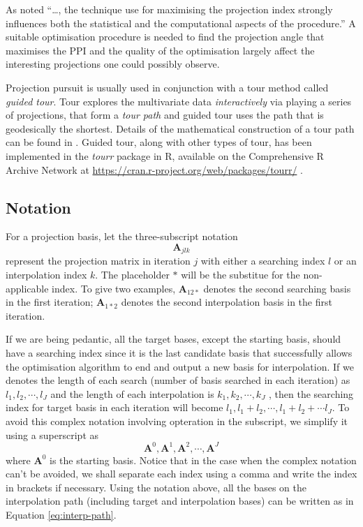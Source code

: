 \documentclass[12pt]{article}
\begin{document}
As \citet{friedman1974projection} noted ``\ldots{}, the technique use
for maximising the projection index strongly influences both the
statistical and the computational aspects of the procedure.'' A suitable
optimisation procedure is needed to find the projection angle that
maximises the PPI and the quality of the optimisation largely affect the
interesting projections one could possibly observe.

Projection pursuit is usually used in conjunction with a tour method
called \emph{guided tour}. Tour explores the multivariate data
\emph{interactively} via playing a series of projections, that form a
\emph{tour path} and guided tour uses the path that is geodesically the
shortest. Details of the mathematical construction of a tour path can be
found in \citet{buja2005computational}. Guided tour, along with other
types of tour, has been implemented in the \emph{tourr} package in R,
available on the Comprehensive R Archive Network at
\url{https://cran.r-project.org/web/packages/tourr/}
\citep{wickham2011tourrpackage}.

\hypertarget{notation}{%
\subsection{Notation}\label{notation}}

For a projection basis, let the three-subscript notation
\[\mathbf{A}_{jlk}\] represent the projection matrix in iteration \(j\)
with either a searching index \(l\) or an interpolation index \(k\). The
placeholder \(*\) will be the substitue for the non-applicable index. To
give two examples, \(\mathbf{A}_{12*}\) denotes the second searching
basis in the first iteration; \(\mathbf{A}_{1*2}\) denotes the second
interpolation basis in the first iteration.

If we are being pedantic, all the target bases, except the starting
basis, should have a searching index since it is the last candidate
basis that successfully allows the optimisation algorithm to end and
output a new basis for interpolation. If we denotes the length of each
search (number of basis searched in each iteration) as
\(l_1, l_2, \cdots, l_J\) and the length of each interpolation is
\(k_1, k_2, \cdots, k_J\) , then the searching index for target basis in
each iteration will become
\(l_1, l_1 + l_2, \cdots, l_1 +l_2+\cdots l_J\). To avoid this complex
notation involving opteration in the subscript, we simplify it using a
superscript as
\[\mathbf{A}^{0}, \mathbf{A}^{1}, \mathbf{A}^{2}, \cdots, \mathbf{A}^{J}\]
where \(\mathbf{A}^{0}\) is the starting basis. Notice that in the case
when the complex notation can't be avoided, we shall separate each index
using a comma and write the index in brackets if necessary. Using the
notation above, all the bases on the interpolation path (including
target and interpolation bases) can be written as in Equation
\ref{eq:interp-path}.
\end{document}
